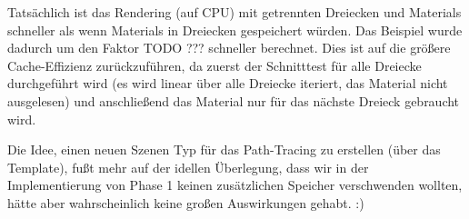 Tatsächlich ist das Rendering (auf CPU) mit getrennten Dreiecken und Materials schneller als wenn Materials in Dreiecken gespeichert würden. Das  Beispiel wurde dadurch um den Faktor TODO ??? schneller berechnet. Dies ist auf die größere Cache-Effizienz zurückzuführen, da zuerst der Schnitttest für alle Dreiecke durchgeführt wird (es wird linear über alle Dreiecke iteriert, das Material nicht ausgelesen) und anschließend das Material nur für das nächste Dreieck gebraucht wird.

Die Idee, einen neuen Szenen Typ für das Path-Tracing zu erstellen (über das  Template), fußt mehr auf der idellen Überlegung, dass wir in der Implementierung von Phase 1 keinen zusätzlichen Speicher verschwenden wollten, hätte aber wahrscheinlich keine großen Auswirkungen gehabt. :)


